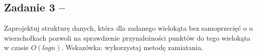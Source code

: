 \subsection{Zadanie 3 -- }
Zaprojektuj strukturę danych, która dla zadanego wielokąta bez samoprzecięć o 
$n$ wierzchołkach pozwoli
na sprawdzenie przynależności punktów do tego wielokąta w czasie $O(log n)$.
Wskazówka: wykorzystaj metodę zamiatania.